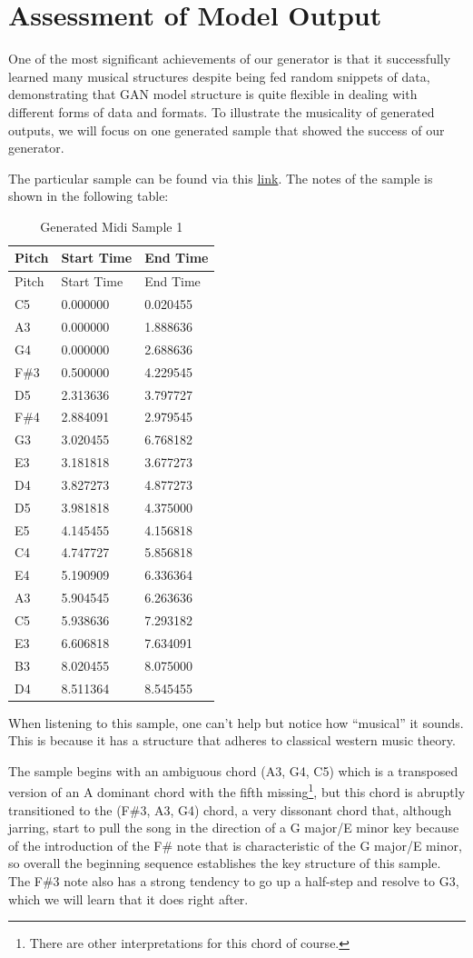\documentclass[12pt,oneside]{chicagocapstone}
\begin{document}
\newpage

\hypertarget{findings-assess_model}{%
\section*{Assessment of Model Output}\label{findings-assess_model}}

One of the most significant achievements of our generator is that it successfully learned many musical structures despite being fed random snippets of data, demonstrating that GAN model structure is quite flexible in dealing with different forms of data and formats. To illustrate the musicality of generated outputs, we will focus on one generated sample that showed the success of our generator.

The particular sample can be found via this \href{https://github.com/terrywang15/museG_dev/blob/master/2020-01-31\%2002-20/ep_400.mid}{link}. The notes of the sample is shown in the following table:
\begin{longtable}[]{@{}lll@{}}
\caption{Generated Midi Sample 1}\tabularnewline
\toprule
Pitch & Start Time & End Time\tabularnewline
\midrule
\endfirsthead
\toprule
Pitch & Start Time & End Time\tabularnewline
\midrule
\endhead
C5 & 0.000000 & 0.020455\tabularnewline
A3 & 0.000000 & 1.888636\tabularnewline
G4 & 0.000000 & 2.688636\tabularnewline
F\#3 & 0.500000 & 4.229545\tabularnewline
D5 & 2.313636 & 3.797727\tabularnewline
F\#4 & 2.884091 & 2.979545\tabularnewline
G3 & 3.020455 & 6.768182\tabularnewline
E3 & 3.181818 & 3.677273\tabularnewline
D4 & 3.827273 & 4.877273\tabularnewline
D5 & 3.981818 & 4.375000\tabularnewline
E5 & 4.145455 & 4.156818\tabularnewline
C4 & 4.747727 & 5.856818\tabularnewline
E4 & 5.190909 & 6.336364\tabularnewline
A3 & 5.904545 & 6.263636\tabularnewline
C5 & 5.938636 & 7.293182\tabularnewline
E3 & 6.606818 & 7.634091\tabularnewline
B3 & 8.020455 & 8.075000\tabularnewline
D4 & 8.511364 & 8.545455\tabularnewline
\bottomrule
\end{longtable}
When listening to this sample, one can't help but notice how ``musical'' it sounds. This is because it has a structure that adheres to classical western music theory.

The sample begins with an ambiguous chord (A3, G4, C5) which is a transposed version of an A dominant chord with the fifth missing\footnote{There are other interpretations for this chord of course.}, but this chord is abruptly transitioned to the (F\#3, A3, G4) chord, a very dissonant chord that, although jarring, start to pull the song in the direction of a G major/E minor key because of the introduction of the F\# note that is characteristic of the G major/E minor, so overall the beginning sequence establishes the key structure of this sample. The F\#3 note also has a strong tendency to go up a half-step and resolve to G3, which we will learn that it does right after.
\end{document}
